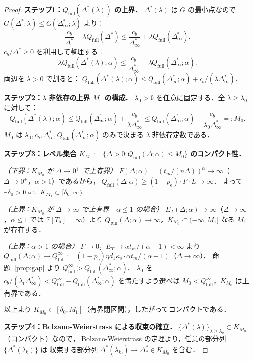 \documentclass[12pt,a4paper]{article}
\theoremstyle{plain}
\theoremstyle{definition}
\theoremstyle{remark}
\newcommand{\E}{\mathbb{E}}
\newcommand{\pe}{p_{\mathrm{e}}}
\newcommand{\Qf}{Q_{\mathrm{full}}}
\newcommand{\Dopt}{\Delta^{*}}
\newcommand{\Dinf}{\Delta^{*}_{\infty}}
\begin{document}
\begin{proof}
\textbf{ステップ1：$\Qf(\Dopt(\lambda))$ の上界．}
$\Dopt(\lambda)$ は $G$ の最小点なので $G(\Dopt;\lambda)\le G(\Dinf;\lambda)$ より：
\[
\frac{c_b}{\Dopt}+\lambda\Qf(\Dopt)\le\frac{c_b}{\Dinf}+\lambda\Qf(\Dinf).
\]
$c_b/\Dopt\ge0$ を利用して整理する：
\begin{equation}\label{eq:Q_ub}
\lambda\Qf(\Dopt(\lambda);\alpha)\le\frac{c_b}{\Dinf}+\lambda\Qf(\Dinf;\alpha).
\end{equation}
両辺を $\lambda>0$ で割ると：
$\Qf(\Dopt(\lambda);\alpha)\le\Qf(\Dinf;\alpha)+c_b/(\lambda\Dinf)$．

\textbf{ステップ2：$\lambda$ 非依存の上界 $M_0$ の構成．}
$\lambda_0>0$ を任意に固定する．全 $\lambda\ge\lambda_0$ に対して：
\begin{equation}\label{eq:M0}
\Qf(\Dopt(\lambda);\alpha)\le\Qf(\Dinf;\alpha)+\frac{c_b}{\lambda\Dinf}
\le\Qf(\Dinf;\alpha)+\frac{c_b}{\lambda_0\Dinf}=:M_0.
\end{equation}
$M_0$ は $\lambda_0,c_b,\Dinf,\Qf(\Dinf;\alpha)$ のみで決まる $\lambda$ 非依存定数である．

\textbf{ステップ3：レベル集合 $K_{M_0}:=\{\Delta>0:\Qf(\Delta;\alpha)\le M_0\}$ のコンパクト性．}

\emph{（下界：$K_{M_0}$ が $\Delta\to0^+$ で上有界）}
$F(\Delta;\alpha)=(t_m/(n\Delta))^\alpha\to\infty$（$\Delta\to0^+$，$\alpha>0$）であるから，
$\Qf(\Delta;\alpha)\ge(1-\pe)\cdot F\cdot L\to\infty$．
よって $\exists\delta_0>0$ s.t. $K_{M_0}\subset[\delta_0,\infty)$．

\emph{（上界：$K_{M_0}$ が $\Delta\to\infty$ で上有界—$\alpha\le1$ の場合）}
$E_T(\Delta;\alpha)\to\infty$（$\Delta\to\infty$，$\alpha\le1$ では $\E[T_d]=\infty$）より
$\Qf(\Delta;\alpha)\to\infty$，$K_{M_0}\subset(-\infty,M_1]$ なる $M_1$ が存在する．

\emph{（上界：$\alpha>1$ の場合）}
$F\to0$，$E_T\to\alpha t_m/(\alpha-1)<\infty$ より
$\Qf(\Delta;\alpha)\to\Qf^\infty:=(1-\pe)\eta d_1\kappa_s\cdot\alpha t_m/(\alpha-1)$（$\Delta\to\infty$）．
命題~\ref{prop:gap} より $\Qf^\infty>\Qf(\Dinf;\alpha)$．
$\lambda_0$ を $c_b/(\lambda_0\Dinf)<\Qf^\infty-\Qf(\Dinf;\alpha)$
を満たすよう選べば $M_0<\Qf^\infty$，$K_{M_0}$ は上有界である．

以上より $K_{M_0}\subset[\delta_0,M_1]$（有界閉区間），したがってコンパクトである．

\textbf{ステップ4：Bolzano-Weierstrass による収束の確立．}
$\{\Dopt(\lambda)\}_{\lambda\ge\lambda_0}\subset K_{M_0}$（コンパクト）なので，
Bolzano-Weierstrass の定理より，任意の部分列 $\{\Dopt(\lambda_k)\}$ は
収束する部分列 $\Dopt(\lambda_{k_j})\to\Dopt_*\in K_{M_0}$ を含む．


\end{proof}
\end{document}
